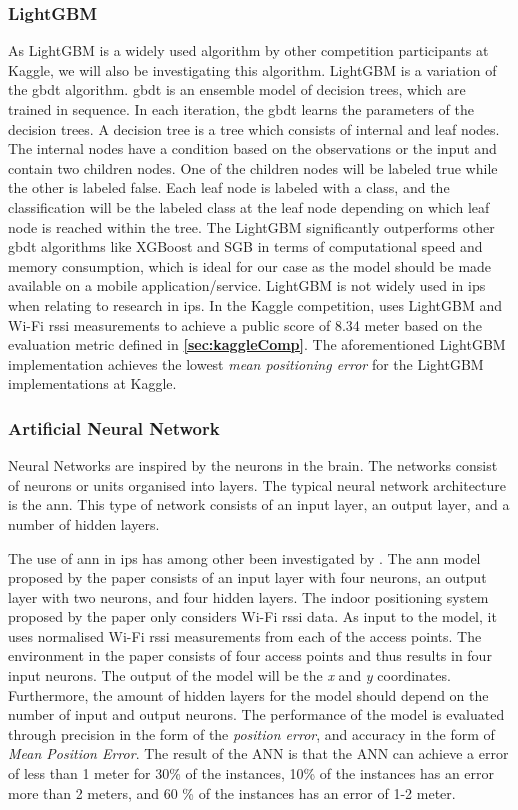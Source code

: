 \subsubsection{LightGBM}
As LightGBM is a widely used algorithm by other competition participants at Kaggle, we will also be investigating this algorithm.
LightGBM is a variation of the \gls{gbdt} algorithm. \gls{gbdt} is an ensemble model of decision trees, which are trained in sequence. In each iteration, the \gls{gbdt} learns the parameters of the decision trees. A decision tree is a tree which consists of internal and leaf nodes. The internal nodes have a condition based on the observations or the input and contain two children nodes. One of the children nodes will be labeled true while the other is labeled false. Each leaf node is labeled with a class, and the classification will be the labeled class at the leaf node depending on which leaf node is reached within the tree\cite{AIBook}.
The LightGBM significantly outperforms other \gls{gbdt} algorithms like XGBoost and SGB in terms of computational speed and memory consumption, which is ideal for our case as the model should be made available on a mobile application/service. \cite{lightgbm} LightGBM is not widely used in \gls{ips} when relating to research in \gls{ips}. In the Kaggle competition, \cite{lgbmKaggle01} uses LightGBM and Wi-Fi \gls{rssi} measurements to achieve a public score of 8.34 meter based on the evaluation metric defined in \textbf{\autoref{sec:kaggleComp}}. The aforementioned LightGBM implementation achieves the lowest \textit{mean positioning error} for the LightGBM implementations at Kaggle.

\subsubsection{Artificial Neural Network}
Neural Networks are inspired by the neurons in the brain. The networks consist of neurons or units organised into layers. The typical neural network architecture is the \gls{ann}. This type of network consists of an input layer, an output layer, and a number of hidden layers\cite{AIBook}. 

The use of \gls{ann} in \gls{ips} has among other been investigated by \cite{ANN01}. The \gls{ann} model proposed by the paper consists of an input layer with four neurons, an output layer with two neurons, and four hidden layers. The indoor positioning system proposed by the paper only considers Wi-Fi \gls{rssi} data. As input to the model, it uses normalised Wi-Fi \gls{rssi} measurements from each of the access points. The environment in the paper consists of four access points and thus results in four input neurons. The output of the model will be the \textit{x} and \textit{y} coordinates. Furthermore, the amount of hidden layers for the model should depend on the number of input and output neurons. The performance of the model is evaluated through precision in the form of the \textit{position error}, and accuracy in the form of \textit{Mean Position Error}. The result of the ANN is that the ANN can achieve a error of less than 1 meter for 30\% of the instances, 10\% of the instances has an error more than 2 meters, and 60 \% of the instances has an error of 1-2 meter. 

